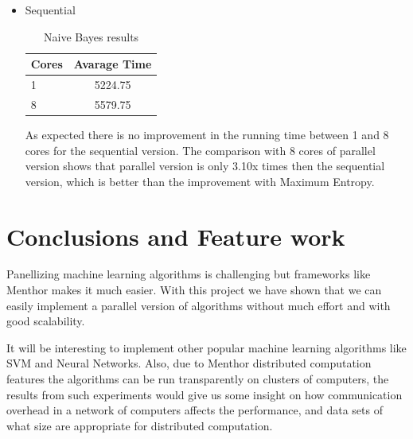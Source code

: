 \documentclass{report}
\begin{document}
\begin{itemize}
\item Sequential

\begin{table}[!htb]
\centering
\begin{tabular}{ l c }
    \hline\hline
    Cores & Avarage Time \\ [0.2ex]
    \hline
    1 & 5224.75 \\
    8 & 5579.75  \\
    \hline
  \end{tabular}
\label{table:naivebayes2}
\caption{Naive Bayes results}
\end{table}

As expected there is no improvement in the running time between 1 and 8 cores for the sequential version.  The comparison with 8 cores of parallel version shows that parallel version is only 3.10x times then the sequential version, which is better than the improvement with Maximum Entropy.

\end{itemize}

\chapter{Conclusions and Feature work}

Panellizing machine learning algorithms is challenging but frameworks like Menthor makes it much easier. With this project we have shown that  we can easily implement a parallel version of algorithms without much effort and with good scalability.

It will be interesting to implement other popular machine learning algorithms like SVM and Neural Networks. Also, due to Menthor distributed computation features the algorithms can be run transparently on clusters of computers, the results from  such experiments would give us some insight on how communication overhead in a network of computers affects the performance, and data sets of what size are appropriate for distributed computation.

{}

\end{document}
